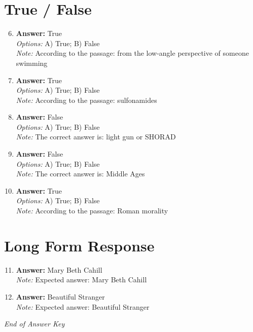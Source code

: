 \documentclass[12pt]{article}
\begin{document}
\section*{True / False}
\begin{enumerate}[label=\arabic*.]
\setcounter{enumi}{5}
\item \textbf{Answer:} True
\\ \textit{Options:} A) True; B) False
\\ \textit{Note:} According to the passage: from the low-angle perspective of someone swimming
\item \textbf{Answer:} True
\\ \textit{Options:} A) True; B) False
\\ \textit{Note:} According to the passage: sulfonamides
\item \textbf{Answer:} False
\\ \textit{Options:} A) True; B) False
\\ \textit{Note:} The correct answer is: light gun or SHORAD
\item \textbf{Answer:} False
\\ \textit{Options:} A) True; B) False
\\ \textit{Note:} The correct answer is: Middle Ages
\item \textbf{Answer:} True
\\ \textit{Options:} A) True; B) False
\\ \textit{Note:} According to the passage: Roman morality
\end{enumerate}

\section*{Long Form Response}
\begin{enumerate}[label=\arabic*.]
\setcounter{enumi}{10}
\item \textbf{Answer:} Mary Beth Cahill
\\ \textit{Note:} Expected answer: Mary Beth Cahill
\item \textbf{Answer:} Beautiful Stranger
\\ \textit{Note:} Expected answer: Beautiful Stranger
\end{enumerate}

\vfill
\noindent\textit{End of Answer Key}
\end{document}
